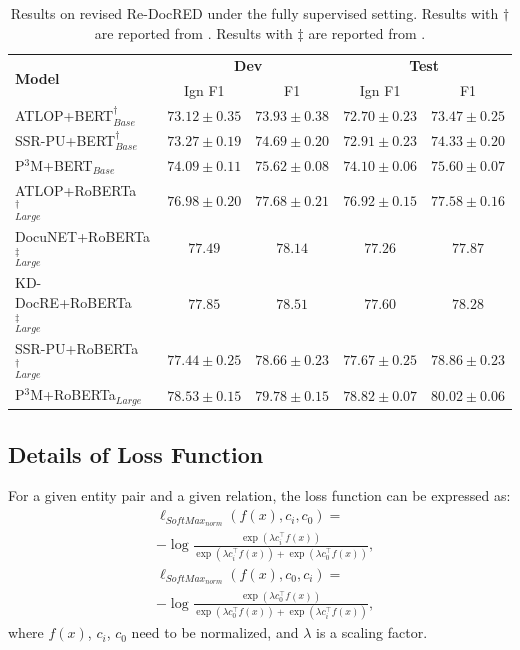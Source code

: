 \documentclass[11pt]{article}
\begin{document}
\begin{table}%
\centering
\small
\begin{tabular}{lcccc}
\toprule \multirow{2}{*}{\textbf{Model}} & \multicolumn{2}{c}{\textbf{Dev}} & \multicolumn{2}{c}{\textbf{Test}} \\
& Ign F1 & F1 & Ign F1 & F1 \\
\midrule ATLOP+BERT$_{Base}^{\dagger}$ & $73.12 \pm 0.35$ & $73.93 \pm 0.38$ & $72.70 \pm 0.23$ & $73.47 \pm 0.25$ \\
SSR-PU+BERT$_{Base}^{\dagger}$ & $73.27 \pm 0.19$ & $74.69 \pm 0.20$ & $72.91 \pm 0.23$ & $74.33 \pm 0.20$ \\
P$^{3}$M+BERT$_{Base}$ & $\mathbf{74.09} \pm \mathbf{0.11}$ & $\mathbf{75.62} \pm \mathbf{0.08}$ & $\mathbf{74.10} \pm \mathbf{0.06}$ & $\mathbf{75.60} \pm \mathbf{0.07}$ \\
\midrule ATLOP+RoBERTa$_{Large}^{\dagger}$ & $76.98 \pm 0.20$ & $77.68 \pm 0.21$ & $76.92 \pm 0.15$ & $77.58 \pm 0.16$ \\
DocuNET+RoBERTa$_{Large}^{\ddagger}$ & $77.49$ & $78.14$ & $77.26$ & $77.87$ \\
KD-DocRE+RoBERTa$_{Large}^{\ddagger}$ & $77.85$ & $78.51$ & $77.60$ & $78.28$ \\
SSR-PU+RoBERTa$_{Large}^{\dagger}$ & $77.44 \pm 0.25$ & $78.66 \pm 0.23$ & $77.67 \pm 0.25$ & $78.86 \pm 0.23$ \\
P$^{3}$M+RoBERTa$_{Large}$ & $\mathbf{78.53} \pm \mathbf{0.15}$ & $\mathbf{79.78} \pm \mathbf{0.15}$ & $\mathbf{78.82} \pm \mathbf{0.07}$ & $\mathbf{80.02} \pm \mathbf{0.06}$ \\
\bottomrule
\end{tabular}
\caption{\label{tab9}
Results on revised Re-DocRED under the fully supervised setting. Results with $\dagger$ are reported from \citep{wang2022unified}. Results with $\ddagger$ are reported from \citep{tan-etal-2022-revisiting}.
}
\end{table}

\subsection{Details of Loss Function}\label{A0}

For a given entity pair and a given relation, the loss function can be expressed as:
\begin{equation}
\begin{aligned}\label{eq1}
&\ell_{SoftMax_{norm}}(f(x), c_{i}, c_{0})= \\ &-\log \frac{\exp (\lambda c_{i}^{\top} f(x))}{\exp (\lambda c_{i}^{\top} f(x)) + \exp (\lambda c_{0}^{\top} f(x))},
\end{aligned}
\end{equation}
\begin{equation}
\begin{aligned}\label{eq2}
&\ell_{SoftMax_{norm}}(f(x), c_{0}, c_{i})= \\ &-\log \frac{\exp (\lambda c_{0}^{\top} f(x))}{\exp (\lambda c_{0}^{\top} f(x)) + \exp (\lambda c_{i}^{\top} f(x))},
\end{aligned}
\end{equation}
where $f(x)$, $c_{i}$, $c_{0}$ need to be normalized, and $\lambda$ is a scaling factor.
\end{document}
